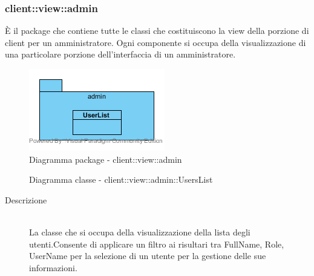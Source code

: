 \vspace{0.5cm}
\subsubsection{client::view::admin}
È il package che contiene tutte le classi che costituiscono la view della porzione di client per un amministratore. Ogni componente si occupa della visualizzazione di una particolare porzione dell'interfaccia di un amministratore.\begin{center}
	\begin{figure}[H]
		\centering \includegraphics[scale=4, max width=\textwidth, max height=\myheight]{../img/diagrammiClassi/client/view/admin.png}
		\caption{Diagramma package - client::view::admin}
	\end{figure}
\end{center}\hypertarget{client::view::admin::UsersList}{}
\begin{figure}[H]
	\centering
	\caption{Diagramma classe - client::view::admin::UsersList}
\end{figure}\begin{description}
\item[Descrizione] \hfill \\
La classe che si occupa della visualizzazione della lista degli utenti.Consente di applicare un filtro ai risultari tra FullName, Role, UserName per la selezione di un utente per la gestione delle sue informazioni.
\end{description}

\vspace{0.5cm}

